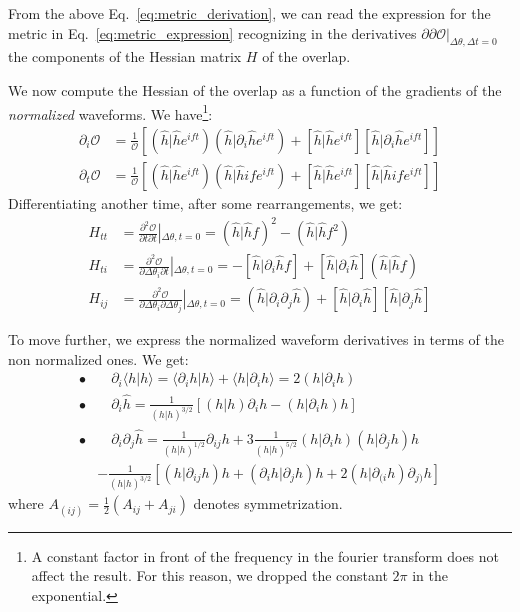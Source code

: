 \documentclass[twocolumn,showpacs,preprintnumbers,nofootinbib,prd,
superscriptaddress,10pt]{revtex4-2}
\newcommand{\scalar}[2]{\langle #1|#2 \rangle}
\newcommand{\rescalar}[2]{( #1|#2 )}
\newcommand{\imscalar}[2]{[ #1|#2 ]}
\begin{document}
From the above Eq.~\eqref{eq:metric_derivation}, we can read the expression for the metric in Eq.~\eqref{eq:metric_expression} recognizing in the derivatives $\partial\partial\mathcal{O}|_{\Delta\theta, \Delta t = 0}$ the components of the Hessian matrix $H$ of the overlap.

We now compute the Hessian of the overlap as a function of the gradients of the {\it normalized} waveforms.
We have\footnote{
A constant factor in front of the frequency in the fourier transform does not affect the result. For this reason, we dropped the constant $2\pi$ in the exponential.}:
\begin{align}
	\partial_i \mathcal{O} &= \frac{1}{\mathcal{O}} \left[ \rescalar{\hat{h}}{\hat{h}e^{ift}}\rescalar{\hat{h}}{\partial_i\hat{h}e^{ift}} + \imscalar{\hat{h}}{\hat{h}e^{ift}}\imscalar{\hat{h}}{\partial_i\hat{h}e^{ift}} \right]\\
	\partial_t \mathcal{O} &= \frac{1}{\mathcal{O}} \left[ \rescalar{\hat{h}}{\hat{h}e^{ift}}\rescalar{\hat{h}}{\hat{h}if e^{ift}} + \imscalar{\hat{h}}{\hat{h}e^{ift}}\imscalar{\hat{h}}{\hat{h}if e^{ift}} \right]
\end{align}
Differentiating another time, after some rearrangements, we get:
\begin{align}
H_{tt} &= \frac{\partial^2 \mathcal{O}}{\partial t \partial t } \left|_{\Delta\theta, t = 0} \right.
								= \rescalar{\hat{h}}{\hat{h}f}^2 - \rescalar{\hat{h}}{\hat{h}f^2} \label{eq:H_tt}\\
H_{ti} &= \frac{\partial^2 \mathcal{O}}{\partial \Delta \theta_i \partial t } \left|_{\Delta\theta, t = 0} \right.
								= - \imscalar{\hat{h}}{\partial_i \hat{h}f} + \imscalar{\hat{h}}{\partial_i\hat{h}} \rescalar{\hat{h}}{\hat{h}f} \label{eq:H_ti}\\
H_{ij} &= \frac{\partial^2 \mathcal{O}}{\partial \Delta \theta_i \partial \Delta \theta_j }\left|_{\Delta\theta, t = 0} \right.
								= \rescalar{\hat{h}}{\partial_i\partial_j\hat{h}} +\imscalar{\hat{h}}{\partial_i\hat{h}} \imscalar{\hat{h}}{\partial_j\hat{h}} \label{eq:H_ij}
\end{align}

To move further, we express the normalized waveform derivatives in terms of the non normalized ones. We get:
\begin{align*}
	\bullet&\quad \partial_i \scalar{h}{h} = \scalar{\partial_i h}{h}+ \scalar{h}{\partial_i h} = 2 \rescalar{h}{\partial_i h} \\
	\bullet&\quad \partial_i \hat{h} =\frac{1}{\rescalar{h}{h}^{3/2}} \left[ \rescalar{h}{h}\partial_i h -  \rescalar{h}{\partial_i h} h \right]	\\
	\bullet &\quad \partial_i \partial_j \hat{h} = \frac{1}{\rescalar{h}{h}^{1/2}} \partial_{ij}h 	+3 \frac{1}{\rescalar{h}{h}^{5/2}} \rescalar{h}{\partial_i h}\rescalar{h}{\partial_j h}h \\
	&- \frac{1}{\rescalar{h}{h}^{3/2}} \left[\rescalar{h}{ \partial_{ij} h} h + \rescalar{\partial_i h}{\partial_j h}  h
		+2\rescalar{h}{\partial_{(i} h} \partial_{j)} h \right]
\end{align*}
where $A_{(ij)} = \frac{1}{2}(A_{ij}+A_{ji})$ denotes symmetrization.
\end{document}
